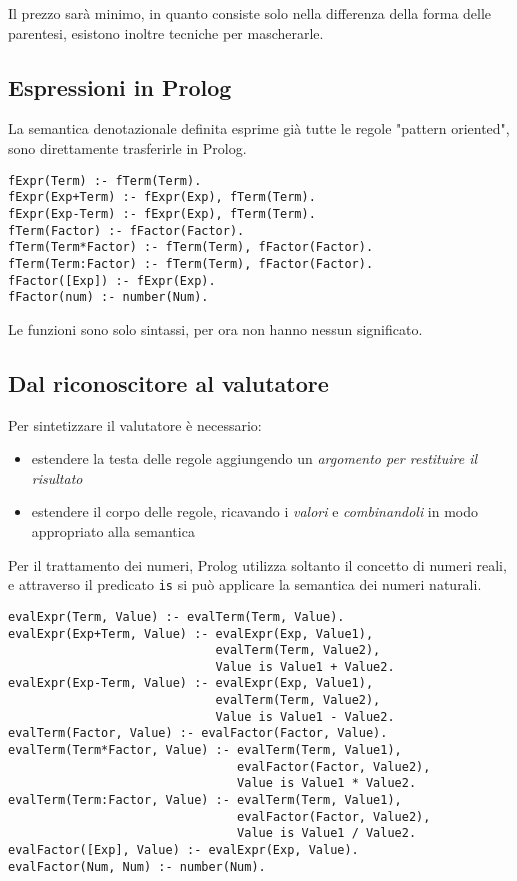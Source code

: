 Il prezzo sarà minimo, in quanto consiste solo nella differenza della forma delle parentesi, esistono inoltre tecniche per mascherarle.

\subsection{Espressioni in Prolog}
La semantica denotazionale definita esprime già tutte le regole "pattern oriented", sono direttamente trasferirle in Prolog.


\begin{verbatim}
fExpr(Term) :- fTerm(Term).
fExpr(Exp+Term) :- fExpr(Exp), fTerm(Term).
fExpr(Exp-Term) :- fExpr(Exp), fTerm(Term).
fTerm(Factor) :- fFactor(Factor).
fTerm(Term*Factor) :- fTerm(Term), fFactor(Factor).
fTerm(Term:Factor) :- fTerm(Term), fFactor(Factor).
fFactor([Exp]) :- fExpr(Exp).
fFactor(num) :- number(Num).
\end{verbatim}

Le funzioni sono solo sintassi, per ora non hanno nessun significato.

\subsection{Dal riconoscitore al valutatore}
Per sintetizzare il valutatore è necessario:
\begin{itemize}
    \item estendere la testa delle regole aggiungendo un \textit{argomento per restituire il risultato}
    \item estendere il corpo delle regole, ricavando i \textit{valori} e \textit{combinandoli} in modo appropriato alla semantica
\end{itemize}

Per il trattamento dei numeri, Prolog utilizza soltanto il concetto di numeri reali, e attraverso il predicato \texttt{is} si può applicare la semantica dei numeri naturali.

\begin{verbatim}
evalExpr(Term, Value) :- evalTerm(Term, Value).
evalExpr(Exp+Term, Value) :- evalExpr(Exp, Value1),
                             evalTerm(Term, Value2),
                             Value is Value1 + Value2.
evalExpr(Exp-Term, Value) :- evalExpr(Exp, Value1),
                             evalTerm(Term, Value2),
                             Value is Value1 - Value2.
evalTerm(Factor, Value) :- evalFactor(Factor, Value).
evalTerm(Term*Factor, Value) :- evalTerm(Term, Value1),
                                evalFactor(Factor, Value2),
                                Value is Value1 * Value2.
evalTerm(Term:Factor, Value) :- evalTerm(Term, Value1),
                                evalFactor(Factor, Value2),
                                Value is Value1 / Value2.
evalFactor([Exp], Value) :- evalExpr(Exp, Value).
evalFactor(Num, Num) :- number(Num).
\end{verbatim}

